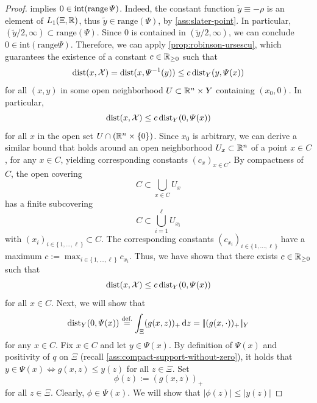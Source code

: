 \begin{proof}
     implies $0\in\operatorname{int}(\operatorname{range} \varPsi)$. Indeed,
    the constant function $\tilde{y} \equiv -\rho$ is an element of $L_1(\Xi, \mathbb{R})$,
    thus $\tilde{y} \in \text{range}(\varPsi)$, by \cref{ass:slater-point}.
    In particular, $(\tilde{y}/2, \infty) \subset \text{range}(\varPsi)$.
    Since $0$ is contained in $(\tilde{y}/2, \infty)$, we can conclude $0\in\text{int}(\text{range}\varPsi)$.
    Therefore, we
    can apply \cref{prop:robinson-ursescu}, which guarantees the existence of a constant
    $c\in\mathbb{R}_{\geq 0}$ such that
    \[
        \operatorname{dist}(x, \mathcal{X}) = \operatorname{dist}(x, \varPsi^{-1}(y)) \leq c \operatorname{dist}_Y(y, \varPsi(x))
    \]
    for all $(x, y)$ in some open neighborhood $U \subset \mathbb{R}^n\times Y$ containing $(x_0, 0)$.
    In particular,
    \begin{equation}
        \label{eq:proof:lem:lower-bound-on-penalties-by-distance-to-feasibility-1}
        \operatorname{dist}(x, \mathcal{X}) \leq c \operatorname{dist}_Y(0, \varPsi(x))        
    \end{equation}
    for all $x$ in the open set $U \cap (\mathbb{R}^n\times \{0\})$. Since $x_0$ is arbitrary,
    we can derive a similar bound that holds around an open neighborhood $U_x \subset \mathbb{R}^n$ of a point $x\in C$, for any
    $x\in C$, yielding corresponding constants $(c_x)_{x\in C}$.
    By compactness of $C$, the open covering
    \[
        C \subset \bigcup_{x\in C} U_x
    \]
    has a finite subcovering
    \[
        C \subset \bigcup_{i=1}^\ell U_{x_i}
    \]
    with $(x_i)_{i\in\{\, 1,\dots, \ell \,\}} \subset C$. The corresponding constants
    $(c_{x_i})_{i\in\{\, 1,\dots, \ell \,\}}$ have a maximum $c := \max_{i\in\{\, 1,\dots, \ell \,\}} c_{x_i}$.
    Thus, we have shown that there exists $c\in\mathbb{R}_{\geq 0}$ such that
    \[
        \operatorname{dist}(x, \mathcal{X}) \leq c \operatorname{dist}_Y(0, \varPsi(x))
    \]
    for all $x\in C$. Next, we will show that
    \begin{equation}
        \label{eq:proof:lem:lower-bound-on-penalties-by-distance-to-feasibility-2}
        \operatorname{dist}_Y(0, \varPsi(x))
        \overset{\text{def.}}{=} \int_{\Xi} (g(x, z))_+ \, \text{d}z = |\!|(g(x, \cdot))_+|\!|_Y
    \end{equation}
    for any $x\in C$.
    Fix $x\in C$ and let $y\in \varPsi(x)$.
    By definition of $\varPsi(x)$ and positivity of $q$ on $\Xi$ (recall \cref{ass:compact-support-without-zero}),
    it holds that $y\in \varPsi(x) \iff g(x, z) \leq y(z)$ for all $z\in \Xi$.
    Set
    \[
        \phi(z) := (g(x, z))_+
    \]
    for all $z\in \Xi$. Clearly, $\phi \in \varPsi(x)$.
    We will show that $|\phi(z)| \leq |y(z)|$

\end{proof}
